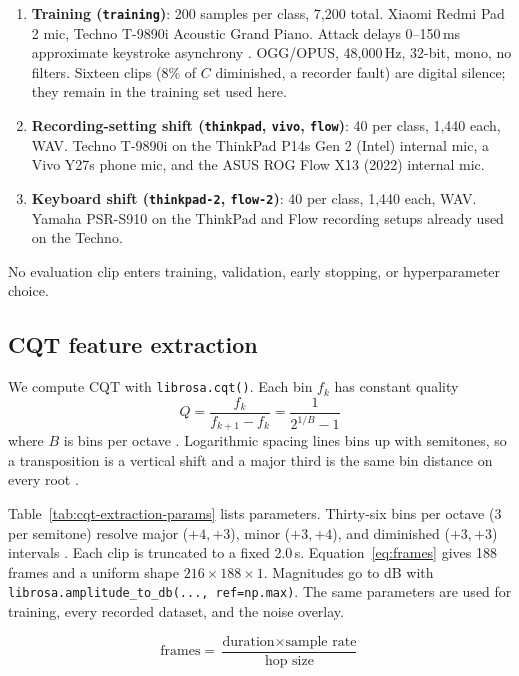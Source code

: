 \documentclass[pdflatex,sn-mathphys-num,iicol]{sn-jnl}
\theoremstyle{thmstyleone}
\theoremstyle{thmstyletwo}
\theoremstyle{thmstylethree}
\begin{document}
\begin{enumerate}[1.]
\item \textbf{Training (\texttt{training})}: 200 samples per class, 7{,}200 total. Xiaomi Redmi Pad 2 mic, Techno T-9890i Acoustic Grand Piano. Attack delays 0--150\,ms approximate keystroke asynchrony \cite{Bella2011}. OGG/OPUS, 48{,}000\,Hz, 32-bit, mono, no filters. Sixteen clips (8\% of $C$ diminished, a recorder fault) are digital silence; they remain in the training set used here.
\item \textbf{Recording-setting shift (\texttt{thinkpad}, \texttt{vivo}, \texttt{flow})}: 40 per class, 1{,}440 each, WAV. Techno T-9890i on the ThinkPad P14s Gen 2 (Intel) internal mic, a Vivo Y27s phone mic, and the ASUS ROG Flow X13 (2022) internal mic.
\item \textbf{Keyboard shift (\texttt{thinkpad-2}, \texttt{flow-2})}: 40 per class, 1{,}440 each, WAV. Yamaha PSR-S910 on the ThinkPad and Flow recording setups already used on the Techno.
\end{enumerate}

No evaluation clip enters training, validation, early stopping, or hyperparameter choice.

\subsection{CQT feature extraction}\label{subsec3_2}

We compute CQT with \texttt{librosa.cqt()}. Each bin $f_k$ has constant quality
\begin{equation}
Q = \frac{f_k}{f_{k+1} - f_k} = \frac{1}{2^{1/B} - 1}
\label{eq:cqt}
\end{equation}
where $B$ is bins per octave \cite{Li2021}\cite{Lacoste2007}. Logarithmic spacing lines bins up with semitones, so a transposition is a vertical shift and a major third is the same bin distance on every root \cite{Harte2010}.

Table~\ref{tab:cqt-extraction-params} lists parameters. Thirty-six bins per octave (3 per semitone) resolve major ($+4,+3$), minor ($+3,+4$), and diminished ($+3,+3$) intervals \cite{Akram2025}\cite{OHanlon2021}. Each clip is truncated to a fixed 2.0\,s. Equation~\ref{eq:frames} gives 188 frames and a uniform shape $216 \times 188 \times 1$. Magnitudes go to dB with \texttt{librosa.amplitude\_to\_db(..., ref=np.max)}. The same parameters are used for training, every recorded dataset, and the noise overlay.

\begin{equation}
\text{frames} = \frac{\text{duration} \times \text{sample rate}}{\text{hop size}}
\label{eq:frames}
\end{equation}
\end{document}
